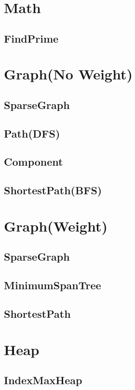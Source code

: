 \section{Math}
    \subsection{FindPrime}
        

\section{Graph(No Weight)}
    \subsection{SparseGraph}
        
    \subsection{Path(DFS)}
        
    \subsection{Component}
        
    \subsection{ShortestPath(BFS)}
        

\section{Graph(Weight)}
    \subsection{SparseGraph}
        
        
    \subsection{MinimumSpanTree}
        
    \subsection{ShortestPath}
        

\section{Heap}
    \subsection{IndexMaxHeap}
        